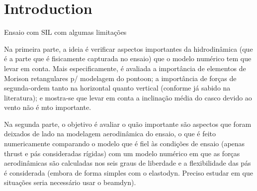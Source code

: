 \section{Introduction} \label{sec:introduction}
Ensaio com SIL com algumas limitações

Na primeira parte, a ideia é verificar aspectos importantes da hidrodinâmica (que é a parte que é fisicamente capturada no ensaio) que o modelo numérico tem que levar em conta. Mais especificamente, é avaliada a importância de elementos de Morison retangulares p/ modelagem do pontoon; a importância de forças de segunda-ordem tanto na horizontal quanto vertical (conforme já sabido na literatura); e mostra-se que levar em conta a inclinação média do casco devido ao vento não é mto importante.

Na segunda parte, o objetivo é avaliar o quão importante são aspectos que foram deixados de lado na modelagem aerodinâmica do ensaio, o que é feito numericamente comparando o modelo que é fiel às condições de ensaio (apenas thrust e pás consideradas rígidas) com um modelo numérico em que as forças aerodinâmicas são calculadas nos seis graus de liberdade e a flexibilidade das pás é considerada (embora de forma simples com o elastodyn. Preciso estudar em que situações seria necessário usar o beamdyn).